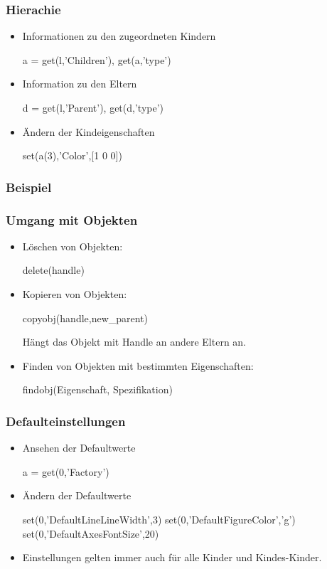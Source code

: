 \documentclass[hyperref={xetex}]{beamer}
\begin{document}
%
%
\begin{frame}[fragile]\frametitle{Hierachie}
\begin{itemize}
\item Informationen zu den zugeordneten Kindern
\begin{matlabin}
a = get(l,'Children'), get(a,'type')
\end{matlabin}
\item Information zu den Eltern
\begin{matlabin}
d = get(l,'Parent'), get(d,'type')
\end{matlabin}
\item \"Andern der Kindeigenschaften
\begin{matlabin}
set(a(3),'Color',[1 0 0])
\end{matlabin}
\end{itemize}
\end{frame}
%
%
\begin{frame}[fragile]\frametitle{Beispiel}
\end{frame}
%
%
\begin{frame}[fragile]\frametitle{Umgang mit Objekten}
\begin{itemize}
\item L\"oschen von Objekten:
\begin{matlabin}
delete(handle) 
\end{matlabin}


\item Kopieren von Objekten: 
\begin{matlabin}
copyobj(handle,new_parent) 
\end{matlabin}
H\"angt das Objekt mit Handle  an andere Eltern
 an.

\item Finden von Objekten mit bestimmten Eigenschaften: 
\begin{matlabin}
findobj(Eigenschaft, Spezifikation)
\end{matlabin}
\end{itemize}
\end{frame}
%
%
\begin{frame}[fragile]\frametitle{Defaulteinstellungen}
\begin{itemize}
\item Ansehen der Defaultwerte
\begin{matlabin}
a = get(0,'Factory')
\end{matlabin}
\item \"Andern der Defaultwerte
\begin{matlabin}
set(0,'DefaultLineLineWidth',3)
set(0,'DefaultFigureColor','g')
set(0,'DefaultAxesFontSize',20)
\end{matlabin}
\item Einstellungen gelten immer auch f\"ur alle Kinder und Kindes-Kinder.
\end{itemize}
\end{frame}
\end{document}
